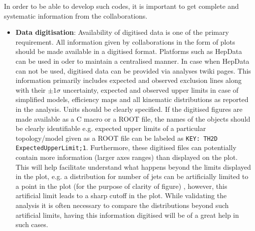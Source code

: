 In order to be able to develop such codes, it is important to get complete and systematic information from the collaborations. 
\begin{itemize}
	\item	\textbf{Data digitisation}: Availability of digitised data is one of the primary requirement. All information given by collaborations in the form of plots should be made available in a digitised format. Platforms such as HepData can be used in oder to maintain a centralised manner. In case when HepData can not be used, digitised data can be provided via analyses twiki pages. This information primarily includes expected and observed exclusion lines along with their $\pm 1 \sigma$ uncertainty, expected and observed upper limits in case of simplified models, efficiency maps and all kinematic distributions as reported in the analysis. Units should be clearly specified. If the digitised figures are made available as a C macro or a ROOT file, the names of the objects should be clearly identifiable e.g. expected upper limits of a particular topology/model given  as a ROOT file can be labeled as \texttt{KEY: TH2D	ExpectedUpperLimit;1}. Furthermore, these digitised files can potentially contain more information (larger axes ranges) than displayed on the plot. This will help facilitate understand what happens beyond the limits displayed in the plot, e.g. a distribution for number of jets can be artificially limited to a point in the plot (for the purpose of clarity of figure) , however, this artificial limit leads to a sharp cutoff in the plot. While validating the analysis it is often necessary to compare the distributions beyond such artificial limits, having this information digitised will be of a great help in such cases. 
\end{itemize}

